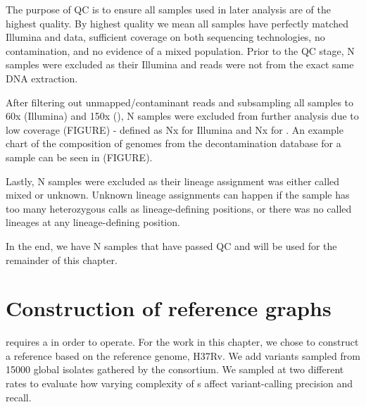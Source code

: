 The purpose of QC is to ensure all samples used in later analysis are of the highest quality. By highest quality we mean all samples have perfectly matched Illumina and \ont{} data, sufficient coverage on both sequencing technologies, no contamination, and no evidence of a mixed \mtb{} population. Prior to the QC stage, N samples were excluded as their Illumina and \ont{} reads were not from the exact same DNA extraction.  

After filtering out unmapped/contaminant reads and subsampling all samples to 60x (Illumina) and 150x (\ont{}), N samples were excluded from further analysis due to low coverage (FIGURE) - defined as Nx for Illumina and Nx for \ont{}. An example chart of the composition of genomes from the decontamination database for a sample can be seen in (FIGURE).  

Lastly, N samples were excluded as their lineage assignment was either called mixed or unknown. Unknown lineage assignments can happen if the sample has too many heterozygous calls as lineage-defining positions, or there was no called lineages at any lineage-defining position.  

In the end, we have N samples that have passed QC and will be used for the remainder of this chapter.




\section{Construction of \mtb{} reference graphs}
\label{sec:tbprg}

\pandora{} requires a \prg{} in order to operate. For the work in this chapter, we chose to construct a reference \prg{} based on the \mtb{} reference genome, H37Rv. We add variants sampled from 15000 global \mtb{} isolates gathered by the \cryptic{} consortium. We sampled at two different rates to evaluate how varying complexity of \prg{}s affect variant-calling precision and recall.


